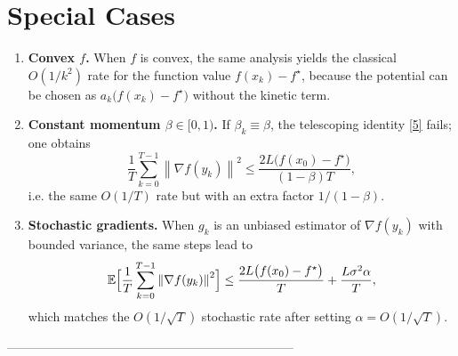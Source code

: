 \documentclass{article}
\newcommand{\norm}[1]{\left\lVert#1\right\rVert}
\newcommand{\grad}{\nabla}
\begin{document}
\section*{Special Cases}
\begin{enumerate}[label=\alph*.]
\item \textbf{Convex $f$.}  
When $f$ is convex, the same analysis yields the classical $O(1/k^{2})$ rate
for the function value $f(x_k)-f^\star$, because the potential can be chosen as
$a_k\bigl(f(x_k)-f^\star\bigr)$ without the kinetic term.
\item \textbf{Constant momentum $\beta\in[0,1)$.}  
If $\beta_k\equiv\beta$, the telescoping identity \eqref{5} fails; one obtains
\[
\frac{1}{T}\sum_{k=0}^{T-1}\norm{\grad f(y_k)}^{2}
\le \frac{2L\bigl(f(x_0)-f^\star\bigr)}{(1-\beta)T},
\]
i.e. the same $O(1/T)$ rate but with an extra factor $1/(1-\beta)$.
\item \textbf{Stochastic gradients.}  
When $g_k$ is an unbiased estimator of $\grad f(y_k)$ with bounded variance,
the same steps lead to
\[
\mathbb{E}\Bigl[\frac{1}{T}\sum_{k=0}^{T-1}\norm{\grad f(y_k)}^{2}\Bigr]
\le \frac{2L\bigl(f(x_0)-f^\star\bigr)}{T}
+\frac{L\sigma^{2}\alpha}{T},
\]
which matches the $O(1/\sqrt{T})$ stochastic rate after setting $\alpha=O(1/\sqrt{T})$.
\end{enumerate}

---------------------------------------------------------------------
\end{document}
